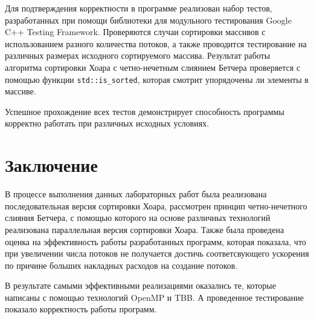 \documentclass{report}
\begin{document}
\par Для подтверждения корректности в программе реализован набор тестов, разработанных при помощи библиотеки для модульного тестирования Google C++ Testing Framework. Проверяются случаи сортировки массивов с использованием разного количества потоков, а также проводится тестирование на различных размерах исходного сортируемого массива. Результат работы алгоритма сортировки Хоара с четно-нечетным слиянием Бетчера проверяется с помощью функции \verb|std::is_sorted|, которая смотрит упорядочены ли элементы в массиве.
\par Успешное прохождение всех тестов демонстрирует способность программы корректно работать при различных исходных условиях. 



\newpage
\section*{Заключение}

\par В процессе выполнения данных лабораторных работ была реализована последовательная версия сортировки Хоара, рассмотрен принцип четно-нечетного слияния Бетчера, с помощью которого на основе различных технологий реализована параллельная версия сортировки Хоара. Также была проведена оценка на эффективность работы разработанных программ, которая показала, что при увеличении числа потоков не получается достичь соответсвующего ускорения по причине больших накладных расходов на создание потоков.
\par В результате самыми эффективными реализациями оказались те, которые написаны с помощью технологий OpenMP и TBB. А проведенное тестирование показало корректность работы программ.

\newpage
\end{document}
